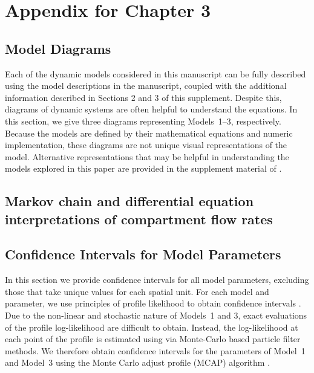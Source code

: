 \chapter{Appendix for Chapter 3}
\label{chpt:appendix_haiti}


\section{Model Diagrams}\label{sec:appendix_haiti_diagrams}

Each of the dynamic models considered in this manuscript can be fully described using the model descriptions in the manuscript, coupled with the additional information described in Sections 2 and 3 of this supplement.
Despite this, diagrams of dynamic systems are often helpful to understand the equations.
In this section, we give three diagrams representing Models~1--3, respectively.
Because the models are defined by their mathematical equations and numeric implementation, these diagrams are not unique visual representations of the model.
Alternative representations that may be helpful in understanding the models explored in this paper are provided in the supplement material of \citet{lee20}.







\section{Markov chain and differential equation interpretations of compartment flow rates}\label{sec:appendix_haiti_details}






\section{Confidence Intervals for Model Parameters}\label{sec:appendix_haiti_ci}

In this section we provide confidence intervals for all model parameters, excluding those that take unique values for each spatial unit.
For each model and parameter, we use principles of profile likelihood to obtain confidence intervals \citep{pawitan01}.
Due to the non-linear and stochastic nature of Models~1 and 3, exact evaluations of the profile log-likelihood are difficult to obtain.
Instead, the log-likelihood at each point of the profile is estimated using via Monte-Carlo based particle filter methods.
We therefore obtain confidence intervals for the parameters of Model~1 and Model~3 using the Monte Carlo adjust profile (MCAP) algorithm \citep{ionides17}.

